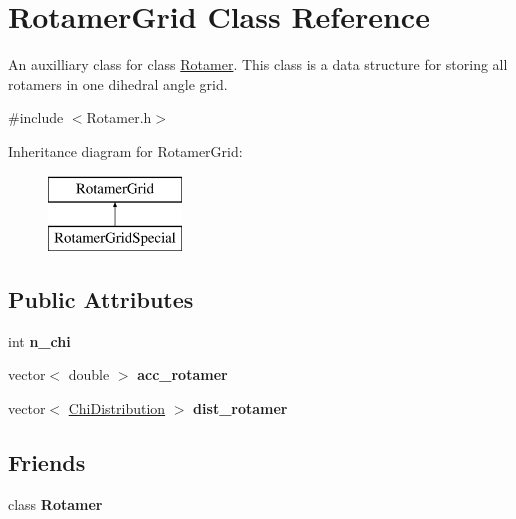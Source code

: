 \hypertarget{classRotamerGrid}{\section{Rotamer\-Grid Class Reference}
\label{classRotamerGrid}
}


An auxilliary class for class \hyperlink{classRotamer}{Rotamer}. This class is a data structure for storing all rotamers in one dihedral angle grid.  




{\ttfamily \#include $<$Rotamer.\-h$>$}

Inheritance diagram for Rotamer\-Grid\-:\begin{figure}[H]
\begin{center}
\leavevmode
\includegraphics[height=2.000000cm]{classRotamerGrid}
\end{center}
\end{figure}
\subsection*{Public Attributes}
\begin{DoxyCompactItemize}
\item 
\hypertarget{classRotamerGrid_a93f842d1194d8b56c5b028a2acf391b3}{int {\bfseries n\-\_\-chi}}\label{classRotamerGrid_a93f842d1194d8b56c5b028a2acf391b3}

\item 
\hypertarget{classRotamerGrid_aaaf79beefd21e576d64eceb73bd78558}{vector$<$ double $>$ {\bfseries acc\-\_\-rotamer}}\label{classRotamerGrid_aaaf79beefd21e576d64eceb73bd78558}

\item 
\hypertarget{classRotamerGrid_aa82fe357e534c137dbd09216be3f24f7}{vector$<$ \hyperlink{classChiDistribution}{Chi\-Distribution} $>$ {\bfseries dist\-\_\-rotamer}}\label{classRotamerGrid_aa82fe357e534c137dbd09216be3f24f7}

\end{DoxyCompactItemize}
\subsection*{Friends}
\begin{DoxyCompactItemize}
\item 
\hypertarget{classRotamerGrid_abbb5e1f6ca569c67c8a354f8698eb62e}{class {\bfseries Rotamer}}\label{classRotamerGrid_abbb5e1f6ca569c67c8a354f8698eb62e}

\end{DoxyCompactItemize}


